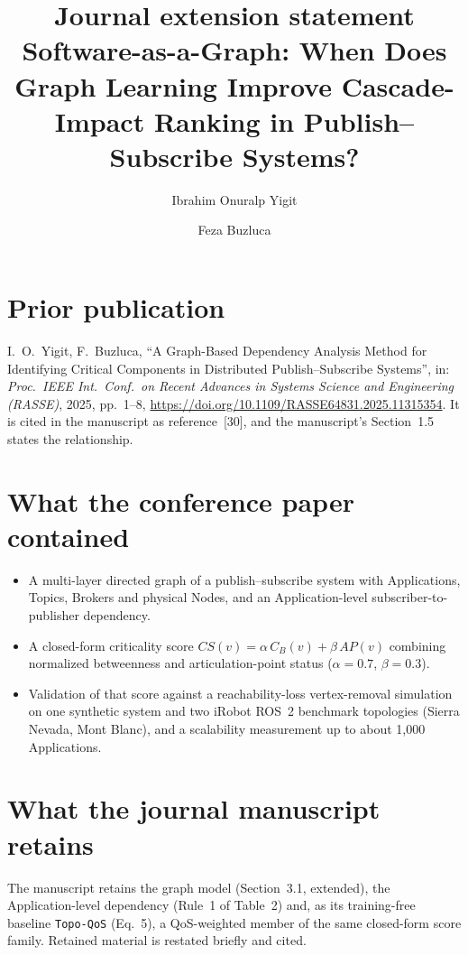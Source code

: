 \documentclass[11pt]{article}
\title{Journal extension statement\\[0.3em]
\large Software-as-a-Graph: When Does Graph Learning Improve Cascade-Impact Ranking in Publish--Subscribe Systems?}
\author{Ibrahim Onuralp Yigit \and Feza Buzluca}
\date{}
\begin{document}
\maketitle

\section*{Prior publication}
I.~O.~Yigit, F.~Buzluca, ``A Graph-Based Dependency Analysis Method for Identifying Critical Components in Distributed Publish--Subscribe Systems'', in: \emph{Proc.\ IEEE Int.\ Conf.\ on Recent Advances in Systems Science and Engineering (RASSE)}, 2025, pp.~1--8, \url{https://doi.org/10.1109/RASSE64831.2025.11315354}. It is cited in the manuscript as reference~[30], and the manuscript's Section~1.5 states the relationship.

\section*{What the conference paper contained}
\begin{itemize}
  \item A multi-layer directed graph of a publish--subscribe system with Applications, Topics, Brokers and physical Nodes, and an Application-level subscriber-to-publisher dependency.
  \item A closed-form criticality score $CS(v) = \alpha\,C_B(v) + \beta\,AP(v)$ combining normalized betweenness and articulation-point status ($\alpha = 0.7$, $\beta = 0.3$).
  \item Validation of that score against a reachability-loss vertex-removal simulation on one synthetic system and two iRobot ROS~2 benchmark topologies (Sierra Nevada, Mont Blanc), and a scalability measurement up to about 1{,}000 Applications.
\end{itemize}

\section*{What the journal manuscript retains}
The manuscript retains the graph model (Section~3.1, extended), the Application-level dependency (Rule~1 of Table~2) and, as its training-free baseline \texttt{Topo-QoS} (Eq.~5), a QoS-weighted member of the same closed-form score family. Retained material is restated briefly and cited.
\end{document}
